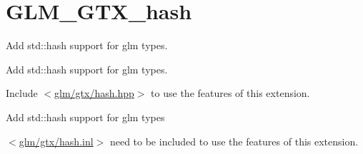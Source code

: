 \hypertarget{group__gtx__hash}{}\section{G\+L\+M\+\_\+\+G\+T\+X\+\_\+hash}
\label{group__gtx__hash}


Add std\+::hash support for glm types.  


Add std\+::hash support for glm types. 

Include $<$\mbox{\hyperlink{hash_8hpp}{glm/gtx/hash.\+hpp}}$>$ to use the features of this extension.

Add std\+::hash support for glm types

$<$\mbox{\hyperlink{hash_8inl}{glm/gtx/hash.\+inl}}$>$ need to be included to use the features of this extension. 